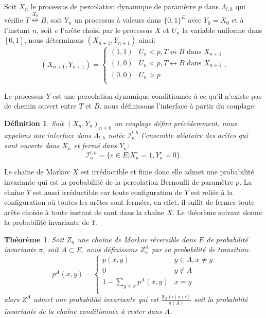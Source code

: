 \documentclass[titlepage,a4paper,12pt]{article}
\newcounter{def}
\newcounter{thm}
\newtheorem{interface}[def]{Définition}
\newtheorem{probainv}[thm]{Théorème}
\newcommand{\connect}{\leftrightarrow}
\newcommand{\nconnect}{\nleftrightarrow}
\begin{document}
Soit $X_n$ le processus de percolation dynamique de paramètre $p$ dans $\Lambda_{l,h}$ qui vérifie $T\overset{X_0}{\nconnect}B$, soit $Y_n$ un processus à valeurs dans $\{0,1\}^E$ avec $Y_0=X_0$ et à l'instant $n$, soit $e$ l'arête choisi par le processus $X$ et $U_n$ la variable uniforme dans $[0,1]$, nous déterminons $(X_{n+1},Y_{n+1})$ ainsi:
$$(X_{n+1},Y_{n+1})=\left\lbrace \begin{array}{cc}
(1,1) & U_n<p,T\nconnect B \text{ dans } X_{n+1}\\
(1,0) & U_n<p,T\connect B \text{ dans } X_{n+1} \\
(0,0) & U_n>p\\
\end{array}\right..$$

Le processus $Y$ est une percolation dynamique conditionnée à ce qu'il n'existe pas de chemin ouvert entre $T$ et $B$. nous définissons l'interface à partir du couplage:
\begin{interface}
Soit $(X_n,Y_n)_{n\leqslant 0}$ un couplage défini précédemment, nous appelons une interface dans $\Lambda_{l,h}$ notée $\mathcal{I}^{l,h}_n$ l'ensemble aléatoire des arêtes qui sont ouverts dans $X_n$ et fermé dans $Y_n$: $$ \mathcal{I}^{l,h}_n = \big\{ e\in E| X_n^e = 1, Y_n^e = 0 \big\}.
$$
\end{interface}
Le chaîne de Markov $X$ est irréductible et finie donc elle admet une probabilité invariante qui est la probabilité de la percolation Bernoulli de paramètre $p$. La chaîne $Y$ est aussi irréductible car toute configuration de $Y$ est reliée à la configuration où toutes les arêtes sont fermées, en effet, il suffit de fermer toute arête choisie à toute instant de saut dans la chaîne $X$. Le théorème suivant donne la probabilité invariante de $Y$.
\begin{probainv}
Soit $Z_n$ une chaîne de Markov réversible dans $E$ de probabilité invariante $\pi$, soit $A\subset E$, nous définissons $Z_n^A$ par sa probabilité de transition:
$$p^A(x,y)=\left\lbrace \begin{array}{cc}
p(x,y) & y\in A, x\neq y \\
0 & y\notin A \\
1-\sum_{y\neq x}p^A(x,y) & x = y\\
\end{array}
\right.
$$
alors $Z^A$ admet une probabilité invariante qui est $\frac{\mathbf{1}_A(\centerdot)\pi(\centerdot)}{\pi(A)}$ soit la probabilité invariante de la chaîne conditionnée à rester dans $A$.
\end{probainv}
\end{document}
